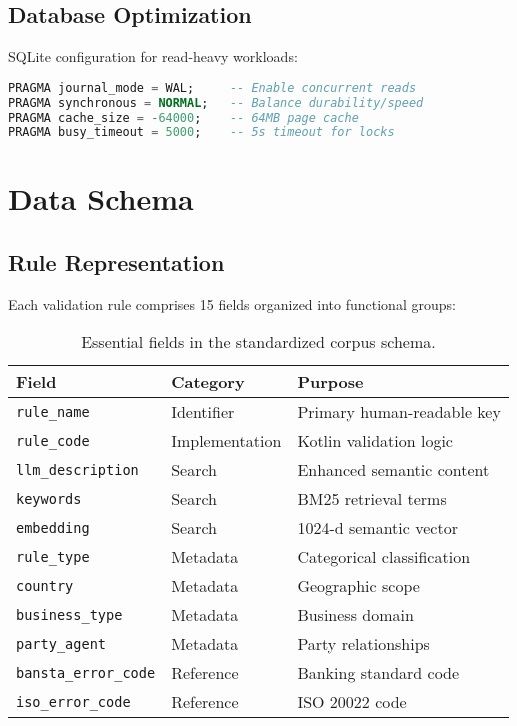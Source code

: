 \subsection{Database Optimization}

SQLite configuration for read-heavy workloads:

\begin{lstlisting}[language=SQL, caption={SQLite optimization pragmas}, label={lst:db-pragmas}]
PRAGMA journal_mode = WAL;     -- Enable concurrent reads
PRAGMA synchronous = NORMAL;   -- Balance durability/speed
PRAGMA cache_size = -64000;    -- 64MB page cache
PRAGMA busy_timeout = 5000;    -- 5s timeout for locks
\end{lstlisting}

\section{Data Schema}
\label{sec:app-schema}

\subsection{Rule Representation}

Each validation rule comprises 15 fields organized into functional groups:

\begin{table}[!ht]
\centering
\small
\begin{tabular}{p{3.5cm}p{2.5cm}p{5cm}}
\toprule
\textbf{Field} & \textbf{Category} & \textbf{Purpose} \\
\midrule
\texttt{rule\_name} & Identifier & Primary human-readable key \\
\texttt{rule\_code} & Implementation & Kotlin validation logic \\
\texttt{llm\_description} & Search & Enhanced semantic content \\
\texttt{keywords} & Search & BM25 retrieval terms \\
\texttt{embedding} & Search & 1024-d semantic vector \\
\texttt{rule\_type} & Metadata & Categorical classification \\
\texttt{country} & Metadata & Geographic scope \\
\texttt{business\_type} & Metadata & Business domain \\
\texttt{party\_agent} & Metadata & Party relationships \\
\texttt{bansta\_error\_code} & Reference & Banking standard code \\
\texttt{iso\_error\_code} & Reference & ISO 20022 code \\
\bottomrule
\end{tabular}
\caption{Essential fields in the standardized corpus schema.}
\label{tab:schema-fields}
\end{table}

